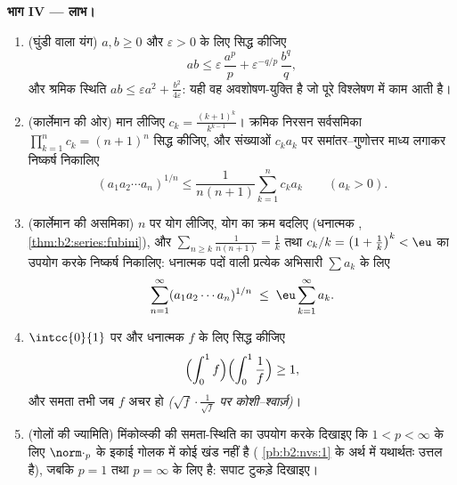 \begin{problem}[{सप्ताहांत समस्या --- यंग, हॉल्डर, मिंकोव्स्की
और घात-माध्य शृंखला}]
\medskip
\noindent\textbf{भाग IV --- लाभ।}
\begin{enumerate}[resume]
  \item (घुंडी वाला यंग) $a, b \geq 0$ और $\varepsilon >
        0$ के लिए सिद्ध कीजिए
        \[
        ab \leq \varepsilon\,\frac{a^p}{p} +
        \varepsilon^{-q/p}\,\frac{b^q}{q},
        \]
        और श्रमिक स्थिति $ab \leq \varepsilon a^2 +
        \frac{b^2}{4\varepsilon}$: यही वह अवशोषण-युक्ति है जो पूरे विश्लेषण
        में काम आती है।
  \item (कार्लेमान की ओर) मान लीजिए $c_k = \frac{(k+1)^k}{k^{k-1}}$। क्रमिक निरसन सर्वसमिका $\prod_{k=1}^{n}c_k =
        (n+1)^n$
        सिद्ध कीजिए, और संख्याओं $c_ka_k$ पर समांतर--गुणोत्तर माध्य लगाकर
        निष्कर्ष निकालिए
        \[
        (a_1a_2\cdots a_n)^{1/n} \leq
        \frac{1}{n(n+1)}\sum_{k=1}^{n} c_k a_k
        \qquad (a_k > 0).
        \]
  \item (कार्लेमान की असमिका) $n$ पर योग लीजिए, योग का क्रम बदलिए
        (धनात्मक , \cref{thm:b2:series:fubini}), और $\sum_{n \geq
        k}\frac{1}{n(n+1)} = \frac1k$ तथा $c_k/k = \bigl(1 +
        \frac1k\bigr)^k < \eu$ का उपयोग करके
        निष्कर्ष निकालिए: धनात्मक पदों वाली प्रत्येक अभिसारी $\sum a_k$ के लिए
        \[
        \sum_{n=1}^{\infty}(a_1a_2\cdots a_n)^{1/n}
        \;\leq\; \eu\sum_{k=1}^{\infty}a_k .
        \]
  \item $\intcc{0}{1}$ पर  और धनात्मक $f$ के लिए सिद्ध कीजिए
        \[
        \Bigl(\int_0^1 f\Bigr)\Bigl(\int_0^1\frac1f\Bigr)
        \geq 1,
        \]
        और समता तभी जब $f$ अचर हो \emph{($\sqrt f\cdot\frac1{\sqrt
        f}$ पर कोशी--श्वार्ज़)}।
  \item (गोलों की ज्यामिति) मिंकोव्स्की की समता-स्थिति का उपयोग करके
        दिखाइए कि $1 < p < \infty$ के लिए $\norm\cdot_p$ के इकाई गोलक में कोई खंड नहीं है
        ( \cref{pb:b2:nvs:1} के अर्थ में यथार्थतः उत्तल है), जबकि $p = 1$ तथा $p =
        \infty$
        के लिए है: सपाट टुकड़े दिखाइए।
\end{enumerate}


\end{problem}
